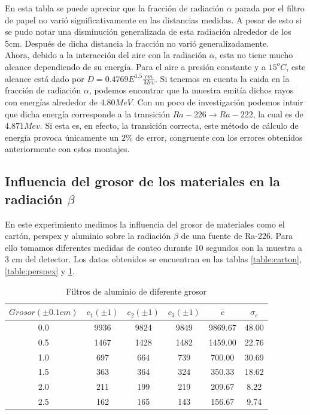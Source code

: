 \documentclass[%
 reprint,
 amsmath,amssymb,
 aps,
]{revtex4-1}
\begin{document}
En esta tabla se puede apreciar que la fracción de radiación $\alpha$ parada por el filtro de papel no varió significativamente en las distancias medidas. A pesar de esto si se pudo notar una disminución generalizada de esta radiación alrededor de los 5cm. Después de dicha distancia la fracción no varió generalizadamente. \\

Ahora, debido a la interacción del aire con la radiación $\alpha$, esta no tiene mucho alcance dependiendo de su energía. Para el aire a presión constante y a $15^oC$, este alcance está dado por $D= 0.4769 E^{1.5}\frac{cm}{Mev}$. Si tenemos en cuenta la caida en la fracción de radiación $\alpha$, podemos encontrar que la muestra emitía dichos rayos con energías alrededor de $4.80 MeV$. Con un poco de investigación podemos intuir que dicha energía corresponde a la transición $Ra-226 \rightarrow Ra-222$, la cual es de $4.871Mev$. Si esta es, en efecto, la transición correcta, este método de cálculo de energía provoca únicamente un $2\%$ de error, congruente con los errores obtenidos anteriormente con estos montajes.\\

\subsection{\label{sec:level2}Influencia del grosor de los materiales en la radiación $\beta$}
En este experimiento medimos la influencia del grosor de materiales como el cartón, perspex y aluminio sobre la radiación $\beta$ de una fuente de Ra-226. Para ello tomamos diferentes medidas de conteo durante 10 segundos con la muestra a 3 cm del detector. Los datos obtenidos se encuentran en las tablas \ref{table:carton}, \ref{table:perspex} y \ref{table:aluminio}.\\

\begin{table}[h!]
\centering
 \begin{tabular}{|c|c|c|c|c|c|} 
 \hline
 $Grosor(\pm0.1cm)$ & $c_1(\pm1)$ & $c_2(\pm1)$ & $c_3(\pm1)$ & $\bar{c}$ & $\sigma_c$ \\ [0.5ex] 
 \hline\hline
 0.0&9936&9824&9849&9869.67&48.00\\
 0.5&1467&1428&1482&1459.00&22.76\\
 1.0&697&664&739&700.00&30.69\\
 1.5&363&364&324&350.33&18.62\\
 2.0&211&199&219&209.67&8.22\\
 2.5&162&165&143&156.67&9.74\\
[1ex] 
 \hline
 \end{tabular}
 \caption{Filtros de aluminio de diferente grosor}
 \label{table:aluminio}
\end{table}
\end{document}
